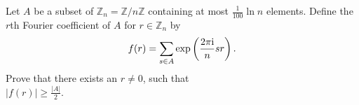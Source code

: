 \documentclass{article}
\begin{document}
	\setlength{\parindent}{0pt}
	Let $A$ be a subset of $\mathbb{Z}_n=\mathbb{Z}/n\mathbb{Z}$ containing at most $\frac{1}{100}\ln n$ elements. Define the $r$th Fourier coefficient of $A$ for $r\in\mathbb{Z}_n$ by
	$$f(r)=\sum_{s\in A}\exp\left(\frac{2\pi\textup{i}}{n}sr\right).$$
	Prove that there exists an $r\neq 0$, such that\\
	$\lvert f(r)\rvert\geq\frac{\lvert A\rvert}{2}.$
\end{document}
